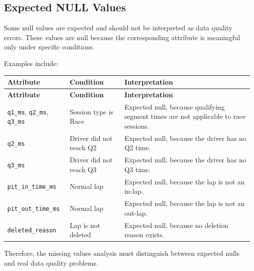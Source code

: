 \documentclass[a4paper,11pt]{article}
\begin{document}
	\subsection{Expected NULL Values}
	
	Some null values are expected and should not be interpreted as data quality errors. These
	values are null because the corresponding attribute is meaningful only under specific
	conditions.
	
	Examples include:
	
	\begin{longtable}{p{4cm}p{5cm}p{5.5cm}}
		\toprule
		\textbf{Attribute} & \textbf{Condition} & \textbf{Interpretation} \\
		\midrule
		\endfirsthead
		
		\toprule
		\textbf{Attribute} & \textbf{Condition} & \textbf{Interpretation} \\
		\midrule
		\endhead
		
		\texttt{q1\_ms}, \texttt{q2\_ms}, \texttt{q3\_ms} &
		Session type is Race &
		Expected null, because qualifying segment times are not applicable to race sessions. \\
		\midrule
		
		\texttt{q2\_ms} &
		Driver did not reach Q2 &
		Expected null, because the driver has no Q2 time. \\
		\midrule
		
		\texttt{q3\_ms} &
		Driver did not reach Q3 &
		Expected null, because the driver has no Q3 time. \\
		\midrule
		
		\texttt{pit\_in\_time\_ms} &
		Normal lap &
		Expected null, because the lap is not an in-lap. \\
		\midrule
		
		\texttt{pit\_out\_time\_ms} &
		Normal lap &
		Expected null, because the lap is not an out-lap. \\
		\midrule
		
		\texttt{deleted\_reason} &
		Lap is not deleted &
		Expected null, because no deletion reason exists. \\
		\bottomrule
	\end{longtable}
	
	Therefore, the missing values analysis must distinguish between expected nulls and real
	data quality problems.
	
\end{document}
